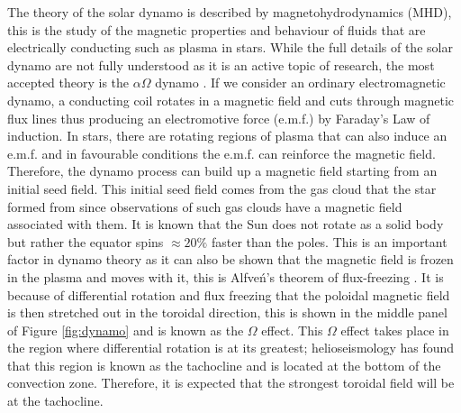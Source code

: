 The theory of the solar dynamo is described by magnetohydrodynamics (MHD), this is the study of the magnetic properties and behaviour of fluids that are electrically conducting such as plasma in stars. While the full details of the solar dynamo are not fully understood as it is an active topic of research, the most accepted theory is the $\alpha\Omega$ dynamo \citep{Choudhuri_2007}. If we consider an ordinary electromagnetic dynamo, a conducting coil rotates in a magnetic field and cuts through magnetic flux lines thus producing an electromotive force (e.m.f.) by Faraday's Law of induction. In stars, there are rotating regions of plasma that can also induce an e.m.f. and in favourable conditions the e.m.f. can reinforce the magnetic field. Therefore, the dynamo process can build up a magnetic field starting from an initial seed field. This initial seed field comes from the gas cloud that the star formed from since observations of such gas clouds have a magnetic field associated with them. It is known that the Sun does not rotate as a solid body but rather the equator spins $\approx 20 \%$ faster than the poles. This is an important factor in dynamo theory as it can also be shown that the magnetic field is frozen in the plasma and moves with it, this is Alfve\'n's theorem of flux-freezing \citep{Alfven_1942}. It is because of differential rotation and flux freezing that the poloidal magnetic field is then stretched out in the toroidal direction, this is shown in the middle panel of Figure \ref{fig:dynamo} and is known as the $\Omega$ effect. This $\Omega$ effect takes place in the region where differential rotation is at its greatest; helioseismology has found that this region is known as the tachocline and is located at the bottom of the convection zone. Therefore, it is expected that the strongest toroidal field will be at the tachocline.


